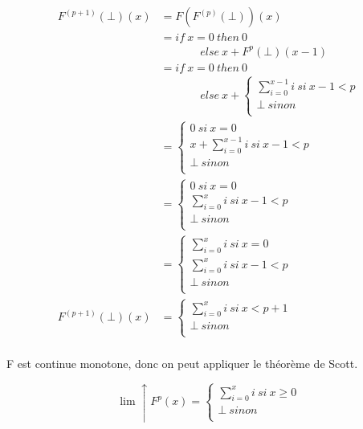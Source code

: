 \documentclass[11pt,a4paper]{article}
\begin{document}
	\begin{align*}
		F^{(p+1)}(\bot)(x) &= F(F^{(p)}(\bot))(x)\\
		&= if\ x = 0\ then\ 0\\
		&\ \ \ \ \ \ \ \ \ \ \ \ \ \ \ \ else\ x + F^p(\bot)(x - 1)\\
		&= if\ x = 0\ then\ 0\\
		&\ \ \ \ \ \ \ \ \ \ \ \ \ \ \ \ else\ x + \begin{cases}
														\sum_{i=0}^{x- 1}i\ si\ x - 1 < p\\
														\bot\ sinon\\
													\end{cases}\\
		&=	\begin{cases}
				0\ si\ x = 0\\
				x + \sum_{i= 0}^{x - 1}i\ si\ x - 1 < p\\
				\bot\ sinon\\
			\end{cases}\\
		&=	\begin{cases}
				0\ si\ x = 0\\
				\sum_{i= 0}^{x}i\ si\ x - 1 < p\\
				\bot\ sinon\\
			\end{cases}\\
		&=	\begin{cases}
				\sum_{i= 0}^{x}i\ si\ x = 0\\
				\sum_{i= 0}^{x}i\ si\ x - 1 < p\\
				\bot\ sinon\\
			\end{cases}\\
		F^{(p + 1)}(\bot)(x) &=	\begin{cases}
									\sum_{i= 0}^{x}i\ si\ x < p + 1\\
									\bot\ sinon\\
								\end{cases}\\
	\end{align*}
	
	F est continue monotone, donc on peut appliquer le théorème de Scott.
	
	$$\lim\uparrow F^p(x) = \begin{cases}
								\sum_{i = 0}^{x}i\ si\ x \geqslant 0\\
								\bot\ sinon\\
							\end{cases}$$
	\newpage					
\end{document}
